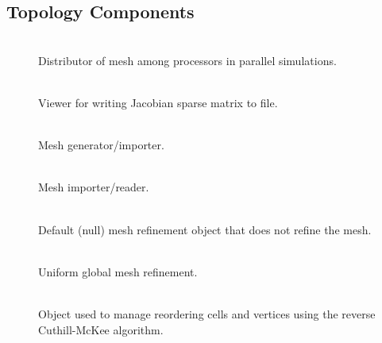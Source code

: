 \subsection{Topology Components}
\begin{description}
\item [] \\
Distributor of mesh among processors in parallel simulations.
\item [] \\
Viewer for writing Jacobian sparse matrix to file.
\item [] \\
Mesh generator/importer.
\item [] \\
Mesh importer/reader.
\item [] \\
Default (null) mesh refinement object that does not refine the mesh.
\item [] \\
Uniform global mesh refinement.
\item [] \\
Object used to manage reordering cells and vertices using the reverse
Cuthill-McKee algorithm.
\end{description}

